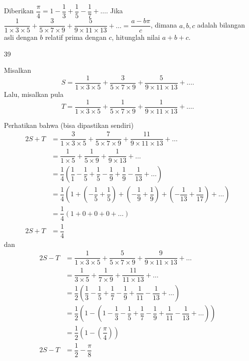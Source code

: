 \documentclass[12pt]{scrartcl}
\begin{document}
	\begin{soalbaru}
			Diberikan $\dfrac{\pi}{4} = 1 - \dfrac{1}{3}+\dfrac{1}{5}-\dfrac{1}{7}+\dots$. Jika  $\dfrac{1}{1 \times 3 \times 5}+\dfrac{3}{5 \times 7 \times 9}+\dfrac{5}{9 \times 11 \times 13}+\dots = \dfrac{a-b\pi}{c}$, dimana $a,b,c$ adalah bilangan asli dengan $b$ relatif prima dengan $c$, hitunglah nilai $a+b+c$.
			
			\begin{jawaban}
			39
			\end{jawaban}
			\begin{solusi}
			Misalkan $$S=\dfrac{1}{1 \times 3 \times 5}+\dfrac{3}{5 \times 7 \times 9}+\dfrac{5}{9 \times 11 \times 13}+\dots.$$ 
			Lalu, misalkan pula $$T=\dfrac{1}{1 \times 3 \times 5}+\dfrac{1}{5 \times 7 \times 9}+\dfrac{1}{9 \times 11 \times 13}+\dots.$$
			
			Perhatikan bahwa (bisa dipastikan sendiri) 
			\begin{equation*}
			\begin{split}
			2S+T &= \dfrac{3}{1 \times 3 \times 5}+\dfrac{7}{5 \times 7 \times 9}+\dfrac{11}{9 \times 11 \times 13}+\dots\\
			&=\dfrac{1}{1 \times 5}+\dfrac{1}{5 \times 9}+\dfrac{1}{9 \times 13}+\dots\\
			&=\dfrac{1}{4}\left(\dfrac{1}{1}-\dfrac{1}{5}+\dfrac{1}{5}-\dfrac{1}{9}+\dfrac{1}{9}-\dfrac{1}{13}+\dots\right)\\
			&=\dfrac{1}{4}\left(1+\left(-\dfrac{1}{5}+\dfrac{1}{5}\right)+\left(-\dfrac{1}{9}+\dfrac{1}{9}\right)+\left(-\dfrac{1}{13}+\dfrac{1}{17}\right)+\dots\right)\\
			&=\dfrac{1}{4}\left(1+0+0+0+\dots\right)\\
			2S+T&=\dfrac{1}{4}
			\end{split}
			\end{equation*}
			dan
			\begin{equation*}
			\begin{split}
			2S-T&= \dfrac{1}{1 \times 3 \times 5}+\dfrac{5}{5 \times 7 \times 9}+\dfrac{9}{9 \times 11 \times 13}+\dots\\
				&=\dfrac{1}{3 \times 5}+\dfrac{1}{7 \times 9}+\dfrac{11}{11 \times 13}+\dots\\
				&=\dfrac{1}{2}\left(\dfrac{1}{3}-\dfrac{1}{5}+\dfrac{1}{7}-\dfrac{1}{9}+\dfrac{1}{11}-\dfrac{1}{13}+\dots\right)\\
				&=\dfrac{1}{2}\left(1-\left(1-\dfrac{1}{3}-\dfrac{1}{5}+\dfrac{1}{7}-\dfrac{1}{9}+\dfrac{1}{11}-\dfrac{1}{13}+\dots\right)\right)\\
				&=\dfrac{1}{2}\left(1-\left(\dfrac{\pi}{4}\right)\right)\\
			2S-T&=\dfrac{1}{2}-\dfrac{\pi}{8}
			\end{split}
			\end{equation*}
			

\end{solusi}
\end{soalbaru}
\end{document}
